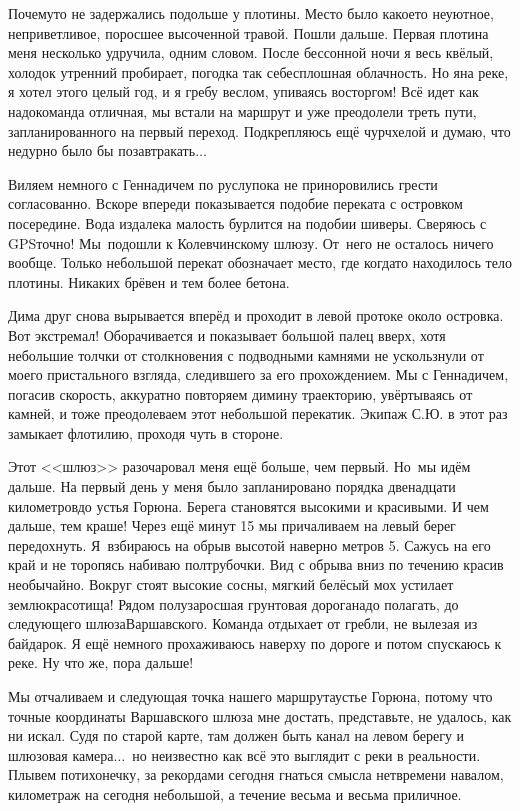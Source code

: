 Почему\sdash то не задержались подольше у плотины. Место было какое\sdash то неуютное, неприветливое, поросшее высоченной травой. Пошли дальше. Первая плотина меня несколько удручила, одним словом. После бессонной ночи я весь квёлый, холодок утренний пробирает, погодка так себе\mdash сплошная облачность. Но я\mdash на реке, я хотел этого целый год, и я гребу веслом, упиваясь восторгом! Всё идет как надо\mdash команда отличная, мы встали на маршрут и уже преодолели треть пути, запланированного на первый переход. Подкрепляюсь ещё чурчхелой и думаю, что недурно было бы позавтракать$\ldots$ 

Виляем немного с Геннадичем по руслу\mdash пока не приноровились грести согласованно. Вскоре впереди показывается подобие переката с островком посередине. Вода издалека малость бурлится на подобии шиверы. Сверяюсь с GPS\mdash точно! Мы~подошли к Колевчинскому шлюзу. От~него не осталось ничего вообще. Только небольшой перекат обозначает место, где когда\sdash то находилось тело плотины. Никаких брёвен и тем более бетона. 

Дима друг снова вырывается вперёд и проходит в левой протоке около островка. Вот экстремал! Оборачивается и показывает большой палец вверх, хотя небольшие толчки от столкновения с подводными камнями не ускользнули от моего пристального взгляда, следившего за его прохождением. Мы с Геннадичем, погасив скорость, аккуратно повторяем димину траекторию, увёртываясь от камней, и тоже преодолеваем этот небольшой перекатик. Экипаж С.Ю. в этот раз замыкает флотилию, проходя чуть в стороне.

Этот <<шлюз>> разочаровал меня ещё больше, чем первый. Но~мы идём дальше. На первый день у меня было запланировано порядка двенадцати километров\mdash до устья Горюна. Берега становятся высокими и красивыми. И чем дальше, тем краше! Через ещё минут 15\thinspace\nbdash{} мы причаливаем на левый берег передохнуть. Я~взбираюсь на обрыв высотой наверно метров 5. Сажусь на его край и не торопясь набиваю полтрубочки. Вид с обрыва вниз по течению красив необычайно. Вокруг стоят высокие сосны, мягкий белёсый мох устилает землю\mdash красотища! Рядом полузаросшая грунтовая дорога\mdash надо полагать, до следующего шлюза\mdash Варшавского. Команда отдыхает от гребли, не вылезая из байдарок. Я ещё немного прохаживаюсь наверху по дороге и потом спускаюсь к реке. Ну что же, пора дальше! 

Мы отчаливаем и следующая точка нашего маршрута\mdash устье Горюна, потому что точные координаты Варшавского шлюза мне достать, представьте, не удалось, как ни искал. Судя по старой карте, там должен быть канал на левом берегу и шлюзовая камера$\ldots$~но неизвестно как всё это выглядит с реки в реальности. Плывем потихонечку, за рекордами сегодня гнаться смысла нет\mdash времени навалом, километраж на сегодня небольшой, а течение весьма и весьма приличное. 

